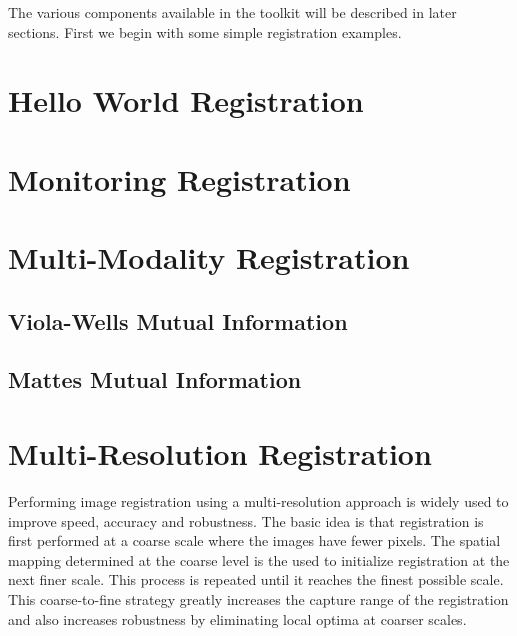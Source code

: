 The various components available in the toolkit will be described in later sections.
First we begin with some simple registration examples.

\section{Hello World Registration}
\label{sec:IntroductionImageRegistration}


\section{Monitoring Registration}
\label{sec:MonitoringImageRegistration}




\section{Multi-Modality Registration}
\label{sec:MultiModalityRegistration}

\subsection{Viola-Wells Mutual Information}
\label{sec:MultiModalityRegistrationViolaWells}


\subsection{Mattes Mutual Information}
\label{sec:MultiModalityRegistrationMattes}




\section{Multi-Resolution Registration}
\label{sec:MultiResolutionRegistration}
Performing image registration using a multi-resolution approach is widely used
to improve speed, accuracy and robustness. The basic idea is that registration
is first performed at a coarse scale where the images have fewer pixels.
The spatial mapping determined at the coarse level is the used to initialize
registration at the next finer scale. This process is repeated until it
reaches the finest possible scale. This coarse-to-fine strategy greatly
increases the capture range of the registration and also increases robustness
by eliminating local optima at coarser scales.

